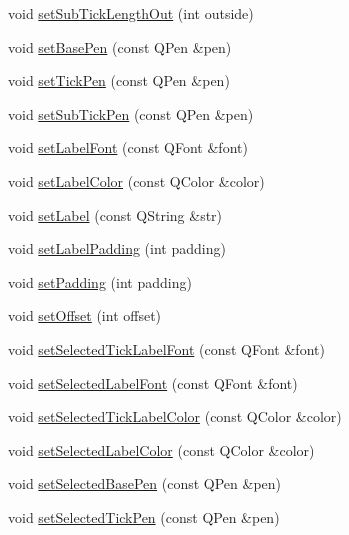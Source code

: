 \begin{DoxyCompactItemize}
\item 
void \mbox{\hyperlink{class_q_c_p_axis_a4c6dfc3963492ed72a77724012df5f23}{set\+Sub\+Tick\+Length\+Out}} (int outside)
\item 
void \mbox{\hyperlink{class_q_c_p_axis_a778d45fb71b3c7ab3bb7079e18b058e4}{set\+Base\+Pen}} (const Q\+Pen \&pen)
\item 
void \mbox{\hyperlink{class_q_c_p_axis_ad80923bcc1c5da4c4db602c5325e797e}{set\+Tick\+Pen}} (const Q\+Pen \&pen)
\item 
void \mbox{\hyperlink{class_q_c_p_axis_aede4028ae7516bd51a60618a8233f9cf}{set\+Sub\+Tick\+Pen}} (const Q\+Pen \&pen)
\item 
void \mbox{\hyperlink{class_q_c_p_axis_a71ac1a47f7547e490a8c4311d1433cf3}{set\+Label\+Font}} (const Q\+Font \&font)
\item 
void \mbox{\hyperlink{class_q_c_p_axis_a6c906fe56d75f0122335b9f79b999608}{set\+Label\+Color}} (const Q\+Color \&color)
\item 
void \mbox{\hyperlink{class_q_c_p_axis_a33bcc382c111c9f31bb0687352a2dea4}{set\+Label}} (const Q\+String \&str)
\item 
void \mbox{\hyperlink{class_q_c_p_axis_a4391192a766e5d20cfe5cbc17607a7a2}{set\+Label\+Padding}} (int padding)
\item 
void \mbox{\hyperlink{class_q_c_p_axis_a5691441cb3de9e9844855d339c0db279}{set\+Padding}} (int padding)
\item 
void \mbox{\hyperlink{class_q_c_p_axis_a04a652603cbe50eba9969ee6d68873c3}{set\+Offset}} (int offset)
\item 
void \mbox{\hyperlink{class_q_c_p_axis_a845ccb560b7bc5281098a5be494145f6}{set\+Selected\+Tick\+Label\+Font}} (const Q\+Font \&font)
\item 
void \mbox{\hyperlink{class_q_c_p_axis_a02ec2a75d4d8401eaab834fbc6803d30}{set\+Selected\+Label\+Font}} (const Q\+Font \&font)
\item 
void \mbox{\hyperlink{class_q_c_p_axis_a9bdbf5e63ab15187f3a1de9440129227}{set\+Selected\+Tick\+Label\+Color}} (const Q\+Color \&color)
\item 
void \mbox{\hyperlink{class_q_c_p_axis_a5d502dec597c634f491fdd73d151c72d}{set\+Selected\+Label\+Color}} (const Q\+Color \&color)
\item 
void \mbox{\hyperlink{class_q_c_p_axis_aeb917a909215605b95ef2be843de1ee8}{set\+Selected\+Base\+Pen}} (const Q\+Pen \&pen)
\item 
void \mbox{\hyperlink{class_q_c_p_axis_a8360502685eb782edbf04019c9345cdc}{set\+Selected\+Tick\+Pen}} (const Q\+Pen \&pen)

\end{DoxyCompactItemize}
